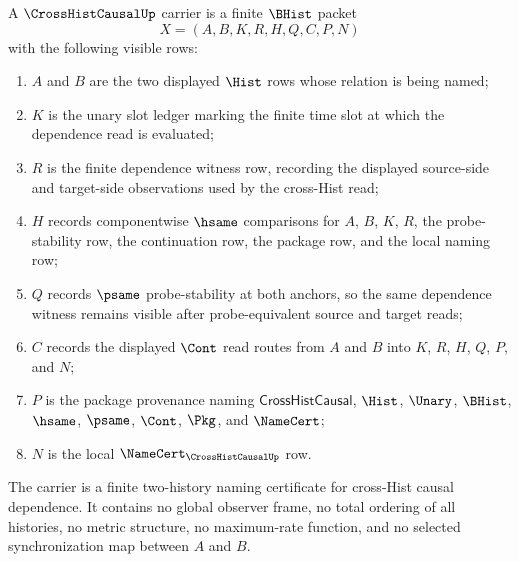 \begin{definition}
\label{def:cross-hist-causal-carrier}
A $\CrossHistCausalUp$ carrier is a finite $\BHist$ packet
$$
X=(A,B,K,R,H,Q,C,P,N)
$$
with the following visible rows:
\begin{enumerate}
\item $A$ and $B$ are the two displayed $\Hist$ rows whose relation is being named;
\item $K$ is the unary slot ledger marking the finite time slot at which the dependence read is evaluated;
\item $R$ is the finite dependence witness row, recording the displayed source-side and target-side observations used by the cross-Hist read;
\item $H$ records componentwise $\hsame$ comparisons for $A$, $B$, $K$, $R$, the probe-stability row, the continuation row, the package row, and the local naming row;
\item $Q$ records $\psame$ probe-stability at both anchors, so the same dependence witness remains visible after probe-equivalent source and target reads;
\item $C$ records the displayed $\Cont$ read routes from $A$ and $B$ into $K$, $R$, $H$, $Q$, $P$, and $N$;
\item $P$ is the package provenance naming $\mathsf{CrossHistCausal}$, $\Hist$, $\Unary$, $\BHist$, $\hsame$, $\psame$, $\Cont$, $\Pkg$, and $\NameCert$;
\item $N$ is the local $\NameCert_{\CrossHistCausalUp}$ row.
\end{enumerate}
The carrier is a finite two-history naming certificate for cross-Hist causal dependence. It contains no global observer frame, no total ordering of all histories, no metric structure, no maximum-rate function, and no selected synchronization map between $A$ and $B$.
\end{definition}

